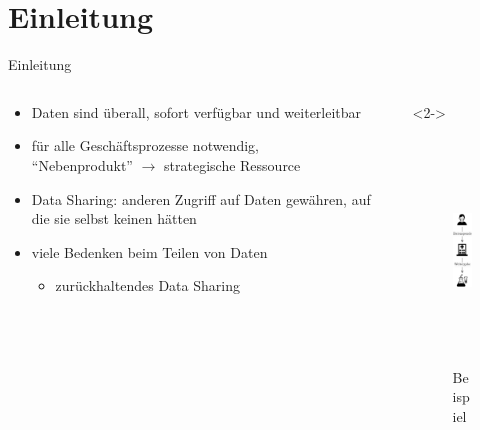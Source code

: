 
{
    \section{Einleitung}
}

\begin{frame}{Einleitung}
    \begin{columns}
        \begin{column}{0.7\textwidth}
            \begin{itemize}
                \item Daten sind überall, sofort verfügbar und weiterleitbar
                \item für alle Geschäftsprozesse notwendig,\\
                    \enquote{Nebenprodukt} $\to$ strategische Ressource~\cite{mollerIndustrialDataEcosystems2024}
                
                \item<2-> \alert{Data Sharing}: anderen Zugriff auf Daten gewähren, auf die sie selbst keinen hätten~\cite{mollerIndustrialDataEcosystems2024}
                
                \item<3-> viele Bedenken beim Teilen von Daten~\cite{mollerIndustrialDataEcosystems2024}
                \begin{itemize}
                    
                    \item<4->[$\Rightarrow$] zurückhaltendes Data Sharing
                \end{itemize}

            \end{itemize}
        \end{column}

        \begin{column}{0.3\textwidth}<2->
            \begin{figure}
                \includegraphics[height=6cm]{./assets/example_vertical.drawio.pdf}
                \caption{Beispiel}
            \end{figure}
        \end{column}
    \end{columns}
\end{frame}


